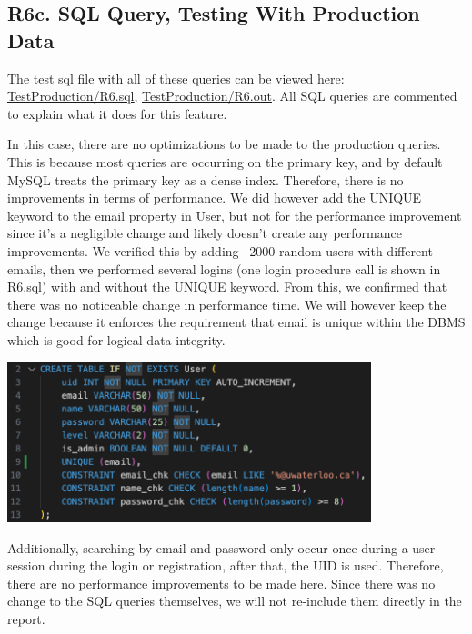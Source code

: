 \documentclass[12pt, a4paper]{article}
\begin{document}
\subsection*{R6c. SQL Query, Testing With Production Data}
The test sql file with all of these queries can be viewed here: \underline{\href{https://github.com/Kggupta/DegreeMap/tree/main/Database/Queries/TestProduction}{TestProduction/R6.sql}}, \underline{\href{https://github.com/Kggupta/DegreeMap/tree/main/Database/Queries/TestProduction}{TestProduction/R6.out}}. All SQL queries are commented to explain what it does for this feature.

In this case, there are no optimizations to be made to the production queries. This is because most queries are occurring on the primary key, and by default MySQL treats the primary key as a dense index. Therefore, there is no improvements in terms of performance. 
We did however add the UNIQUE keyword to the email property in User, but not for the performance improvement since it's a negligible change and likely doesn't create any performance improvements. We verified this by adding ~2000 random users with different emails, then we performed several logins (one login procedure call is shown in R6.sql) with and without the UNIQUE keyword. From this, we confirmed that there was no noticeable change in performance time. We will however keep the change because it enforces the requirement that email is unique within the DBMS which is good for logical data integrity.
\begin{center}
    \includegraphics[width=400px]{R6/unique}
\end{center}
Additionally, searching by email and password only occur once during a user session during the login or registration, after that, the UID is used. Therefore, there are no performance improvements to be made here.
Since there was no change to the SQL queries themselves, we will not re-include them directly in the report.
\end{document}
